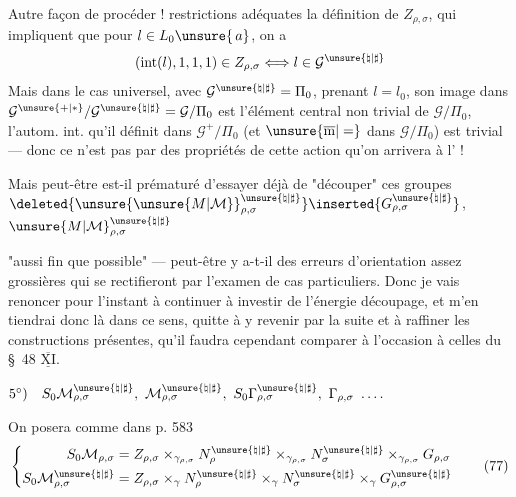 Autre façon de procéder !
  restrictions adéquates 
la définition de $Z_{\rho,\sigma}$, qui
impliquent que
pour $l\in L_0\unsure{\,a}$, on a
\[
(\mathrm{int}(l),1,1,1)\in Z_{\rho,\sigma}
\Longleftrightarrow
l\in\mathcal{G}^{\unsure{\natural|\sharp}}
\]
Mais dans le cas universel, avec
$\mathcal{G}^{\unsure{\natural|\sharp}}=\Pi_0$,
prenant $l=l_0$, son image dans
$\mathcal{G}^{\unsure{+|*}}/
\mathcal{G}^{\unsure{\natural|\sharp}}
=\mathcal{G}/\Pi_0$
est l'élément central non trivial de
$\mathcal{G}/\Pi_0$,
l'autom. int. qu'il définit dans
$\mathcal{G}^+/\Pi_0$
(et $\unsure{\overline{\mathrm m}|=}$ dans
$\mathcal{G}/\Pi_0$)
est trivial --- donc ce n'est pas par
 des propriétés de cette action
qu'on arrivera à l' !

Mais peut-être est-il prématuré d'essayer déjà de "découper" ces groupes
$\deleted{\unsure{\unsure{M|\mathcal{M}}}_{\rho,\sigma}^{\unsure{\natural|\sharp}}}
\inserted{G_{\rho,\sigma}^{\unsure{\natural|\sharp}}}$,
$\unsure{M|\mathcal{M}}_{\rho,\sigma}^{\unsure{\natural|\sharp}}$



"aussi fin que possible" --- peut-être y a-t-il
 des erreurs d'orientation assez grossières qui
se rectifieront par l'examen de cas
particuliers. Donc je vais renoncer
pour l'instant à continuer à investir 
de l'énergie  découpage, et m'en
tiendrai donc là dans ce sens, quitte
à y revenir par la suite et à raffiner
les constructions présentes, qu'il faudra
cependant comparer à l'occasion à celles
du \S~48 $\overline{\underline{\mathrm{XI}}}$.




$5^\circ)\quad S_0\mathcal{M}_{\rho,\sigma}^{\unsure{\natural|\sharp}},\ \mathcal{M}_{\rho,\sigma}^{\unsure{\natural|\sharp}},\ S_0\Gamma_{\rho,\sigma}^{\unsure{\natural|\sharp}},\ \Gamma_{\rho,\sigma}\ \ldots .$

On posera comme dans p. 583
\[
\left\{\begin{aligned}
S_0\mathcal{M}_{\rho,\sigma}
 &= Z_{\rho,\sigma}\times_{\gamma_{\rho,\sigma}}N_\rho^{\unsure{\natural|\sharp}}
 \times_{\gamma_{\rho,\sigma}}N_\sigma^{\unsure{\natural|\sharp}}
 \times_{\gamma_{\rho,\sigma}}G_{\rho,\sigma}\\
S_0\mathcal{M}_{\rho,\sigma}^{\unsure{\natural|\sharp}}
 &= Z_{\rho,\sigma}\times_\gamma N_\rho^{\unsure{\natural|\sharp}}
 \times_\gamma N_\sigma^{\unsure{\natural|\sharp}}\times_\gamma G_{\rho,\sigma}^{\unsure{\natural|\sharp}}
\end{aligned}\right.
\tag{77}
\]

